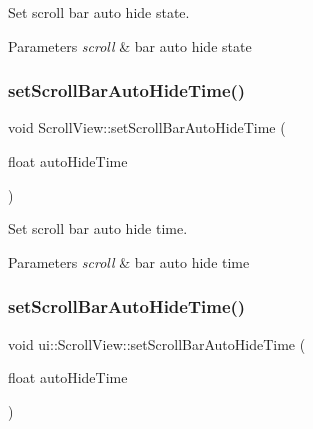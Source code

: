 Set scroll bar auto hide state. 


\begin{DoxyParams}{Parameters}
{\em scroll} & bar auto hide state \\
\hline
\end{DoxyParams}
\mbox{\label{classui_1_1ScrollView_a18f6c3c2f4145c4119db33988a7d474c}} 
\subsubsection{\texorpdfstring{set\+Scroll\+Bar\+Auto\+Hide\+Time()}{setScrollBarAutoHideTime()}\hspace{0.1cm}{\footnotesize\ttfamily [1/2]}}
{\footnotesize\ttfamily void Scroll\+View\+::set\+Scroll\+Bar\+Auto\+Hide\+Time (\begin{DoxyParamCaption}\item[{float}]{auto\+Hide\+Time }\end{DoxyParamCaption})}



Set scroll bar auto hide time. 


\begin{DoxyParams}{Parameters}
{\em scroll} & bar auto hide time \\
\hline
\end{DoxyParams}
\mbox{\label{classui_1_1ScrollView_a388fd5017d29f1686e207348ad040358}} 
\subsubsection{\texorpdfstring{set\+Scroll\+Bar\+Auto\+Hide\+Time()}{setScrollBarAutoHideTime()}\hspace{0.1cm}{\footnotesize\ttfamily [2/2]}}
{\footnotesize\ttfamily void ui\+::\+Scroll\+View\+::set\+Scroll\+Bar\+Auto\+Hide\+Time (\begin{DoxyParamCaption}\item[{float}]{auto\+Hide\+Time }\end{DoxyParamCaption})}




